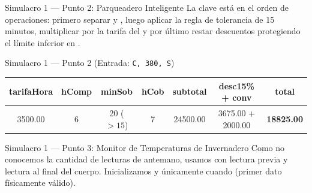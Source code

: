 \documentclass[11pt,letterpaper]{article}
\begin{document}
\begin{solucion}{Simulacro 1 — Punto 2: Parqueadero Inteligente}
La clave está en el orden de operaciones: primero separar  y , luego aplicar la regla de tolerancia de 15 minutos, multiplicar por la tarifa del  y por último restar descuentos protegiendo el límite inferior en .
\end{solucion}



\begin{pruebaescritorio}{Simulacro 1 — Punto 2 (Entrada: \texttt{C, 380, S})}
\begin{center}
\small
\begin{tabular}{ccccccc}
\toprule
\textbf{tarifaHora} & \textbf{hComp} & \textbf{minSob} & \textbf{hCob} & \textbf{subtotal} & \textbf{desc15\% + conv} & \textbf{total} \\
\midrule
3500.00 & 6 & 20 ($>15$) & 7 & 24500.00 & 3675.00 + 2000.00 & \textbf{18825.00} \\
\bottomrule
\end{tabular}
\end{center}
\end{pruebaescritorio}

\begin{solucion}{Simulacro 1 — Punto 3: Monitor de Temperaturas de Invernadero}
Como no conocemos la cantidad de lecturas de antemano, usamos  con lectura previa y lectura al final del cuerpo. Inicializamos  y  únicamente cuando  (primer dato físicamente válido).
\end{solucion}


\end{document}
